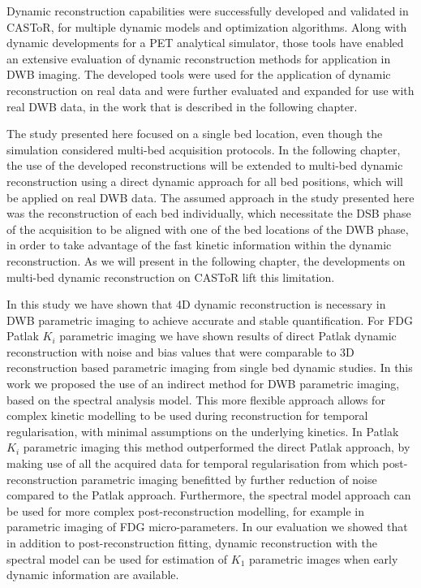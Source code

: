 Dynamic reconstruction capabilities were successfully developed and validated in CASToR, for multiple dynamic models and optimization algorithms. Along with dynamic developments for a PET analytical simulator, those tools have enabled an extensive evaluation of dynamic reconstruction methods for application in DWB imaging. The developed tools were used for the application of dynamic reconstruction on real data and were further evaluated and expanded for use with real DWB data, in the work that is described in the following chapter.

The study presented here focused on a single bed location, even though the simulation considered multi-bed acquisition protocols. In the following chapter, the use of the developed reconstructions will be extended to multi-bed dynamic reconstruction using a direct dynamic approach for all bed positions, which will be applied on real DWB data. 
The assumed approach in the study presented here was the reconstruction of each bed individually, which necessitate the DSB phase of the acquisition to be aligned with one of the bed locations of the DWB phase, in order to take advantage of the fast kinetic information within the dynamic reconstruction. As we will present in the following chapter, the developments on multi-bed dynamic reconstruction on CASToR lift this limitation. 

In this study we have shown that 4D dynamic reconstruction is necessary in DWB parametric imaging to achieve accurate and stable quantification. For FDG Patlak $K_i$ parametric imaging we have shown results of direct Patlak dynamic reconstruction with noise and bias values that were comparable to 3D reconstruction based parametric imaging from single bed dynamic studies. 
In this work we proposed the use of an indirect method for DWB parametric imaging, based on the spectral analysis model. This more flexible approach allows for complex kinetic modelling to be used during reconstruction for temporal regularisation, with minimal assumptions on the underlying kinetics. In Patlak $K_i$ parametric imaging this method outperformed the direct Patlak approach, by making use of all the acquired data for temporal regularisation from which post-reconstruction parametric imaging benefitted by further reduction of noise compared to the Patlak approach. Furthermore, the spectral model approach can be used for more complex post-reconstruction modelling, for example in parametric imaging of FDG micro-parameters.
In our evaluation we showed that in addition to post-reconstruction fitting, dynamic reconstruction with the spectral model can be used for estimation of $K_1$ parametric images when early dynamic information are available.

